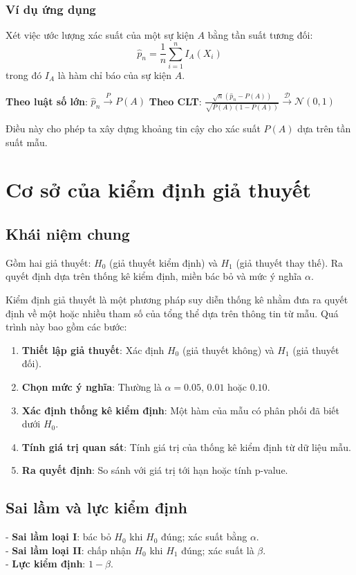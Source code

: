 \subsubsection*{Ví dụ ứng dụng}
Xét việc ước lượng xác suất của một sự kiện $A$ bằng tần suất tương đối:
\[
\hat{p}_n=\frac{1}{n}\sum_{i=1}^n I_A(X_i)
\]
trong đó $I_A$ là hàm chỉ báo của sự kiện $A$.

\textbf{Theo luật số lớn}: $\hat{p}_n\xrightarrow{P}P(A)$
\textbf{Theo CLT}: $\frac{\sqrt{n}(\hat{p}_n-P(A))}{\sqrt{P(A)(1-P(A))}}\xrightarrow{\mathcal{D}}\mathcal{N}(0,1)$

Điều này cho phép ta xây dựng khoảng tin cậy cho xác suất $P(A)$ dựa trên tần suất mẫu.

\section{Cơ sở của kiểm định giả thuyết}

\subsection{Khái niệm chung}
\begin{dn}
Gồm hai giả thuyết: \textbf{$H_0$} (giả thuyết kiểm định) và \textbf{$H_1$} (giả thuyết thay thế). Ra quyết định dựa trên thống kê kiểm định, miền bác bỏ và mức ý nghĩa $\alpha$.
\end{dn}

Kiểm định giả thuyết là một phương pháp suy diễn thống kê nhằm đưa ra quyết định về một hoặc nhiều tham số của tổng thể dựa trên thông tin từ mẫu. Quá trình này bao gồm các bước:

\begin{enumerate}
    \item \textbf{Thiết lập giả thuyết}: Xác định $H_0$ (giả thuyết không) và $H_1$ (giả thuyết đối).
    \item \textbf{Chọn mức ý nghĩa}: Thường là $\alpha = 0.05$, $0.01$ hoặc $0.10$.
    \item \textbf{Xác định thống kê kiểm định}: Một hàm của mẫu có phân phối đã biết dưới $H_0$.
    \item \textbf{Tính giá trị quan sát}: Tính giá trị của thống kê kiểm định từ dữ liệu mẫu.
    \item \textbf{Ra quyết định}: So sánh với giá trị tới hạn hoặc tính p-value.
\end{enumerate}

\subsection{Sai lầm và lực kiểm định}
\begin{tinhchat}
- \textbf{Sai lầm loại I}: bác bỏ $H_0$ khi $H_0$ đúng; xác suất bằng $\alpha$.\\
- \textbf{Sai lầm loại II}: chấp nhận $H_0$ khi $H_1$ đúng; xác suất là $\beta$.\\
- \textbf{Lực kiểm định}: $1-\beta$.
\end{tinhchat}

